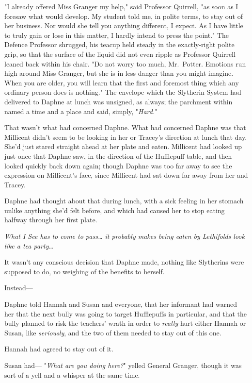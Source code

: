"I already offered Miss Granger my help," said Professor Quirrell, "as soon as
I foresaw what would develop. My student told me, in polite terms, to stay out
of her business. Nor would she tell you anything different, I expect. As I have
little to truly gain or lose in this matter, I hardly intend to press the
point." The Defence Professor shrugged, his teacup held steady in the
exactly-right polite grip, so that the surface of the liquid did not even
ripple as Professor Quirrell leaned back within his chair. "Do not worry too
much, Mr.~Potter. Emotions run high around Miss Granger, but she is in less
danger than you might imagine. When you are older, you will learn that the
first and foremost thing which any ordinary person does is nothing."
\later
The envelope which the Slytherin System had delivered to Daphne at lunch was
unsigned, as always; the parchment within named a time and a place and said,
simply, "\emph{Hard.}"

That wasn't what had concerned Daphne. What had concerned Daphne was that
Millicent didn't seem to be looking in her or Tracey's direction at lunch that
day. She'd just stared straight ahead at her plate and eaten. Millicent had
looked up just once that Daphne saw, in the direction of the Hufflepuff table,
and then looked quickly back down again; though Daphne was too far away to see
the expression on Millicent's face, since Millicent had sat down far away from
her and Tracey.

Daphne had thought about that during lunch, with a sick feeling in her stomach
unlike anything she'd felt before, and which had caused her to stop eating
halfway through her first plate.

\emph{What I See has to come to pass{\ldots} it probably makes being eaten by
Lethifolds look like a tea party{\ldots}}

It wasn't any conscious decision that Daphne made, nothing like Slytherins were
supposed to do, no weighing of the benefits to herself.

Instead---

Daphne told Hannah and Susan and everyone, that her informant had warned her
that the next bully was going to target Hufflepuffs in particular, and that the
bully planned to risk the teachers' wrath in order to \emph{really} hurt either
Hannah or Susan, like \emph{seriously}, and the two of them needed to stay out
of this one.

Hannah had agreed to stay out of it.

Susan had---
\later
"\emph{What are you doing here?}" yelled General Granger, though it was sort of
a yell and a whisper at the same time.

